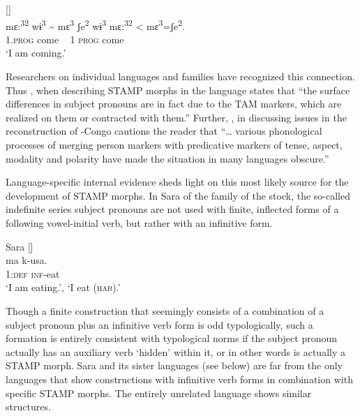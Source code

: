 \documentclass[output=paper]{langsci/langscibook}
\begin{document}
\ea\label{ex:anderson:33}
 \citep[ 3-4]{FiorePeck1973/1980}      []\\
\gll mɛ:\textsuperscript{32}  wɨ\textsuperscript{3}   {\textasciitilde}   mɛ\textsuperscript{3}  ʃe\textsuperscript{2}  wɨ\textsuperscript{3 }   mɛ:\textsuperscript{32} < mɛ\textsuperscript{3}=ʃe\textsuperscript{2}.\\
\textsc{1.prog}  come  ~  1  \textsc{prog}  come\\
\glt `I am coming.'
\z

Researchers on individual languages and families have recognized this connection. Thus \citet[101]{Shimizu1983}, when describing STAMP morphs in the  language   states that ``the surface differences in subject pronouns are in fact due to the TAM markers, which are realized on them or contracted with them.'' Further, \citet[35]{Babaev2010}, in discussing issues in the reconstruction of -Congo cautions the reader that ``… various phonological processes of merging person markers with predicative markers of tense, aspect, modality and polarity have made the situation in many languages obscure.''

  Language-specific internal evidence sheds light on this most likely source for the development of STAMP morphs. In Sara of the  family of the  stock, the so-called indefinite series subject pronouns are not used with finite, inflected forms of a following vowel-initial verb, but rather with an infinitive form.
  
  \ea\label{ex:anderson:34}
  Sara \citep[75]{TuckerBryan1966}      []\\
\gll ma    k-usa.\\
1:\textsc{def}  \textsc{inf}-eat\\
\glt `I am eating.', `I eat (\textsc{hab}).' 
\z

Though a finite construction that seemingly consists of a combination of a subject pronoun  plus an infinitive verb form is odd typologically, such a formation is entirely consistent with typological norms if the subject pronoun actually has an auxiliary verb `hidden' within it, or in other words is actually a STAMP morph. Sara and its sister languages (see  below) are far from the only languages that show constructions with infinitive verb forms in combination with specific STAMP morphs. The entirely unrelated  language  shows similar structures. 
\end{document}
